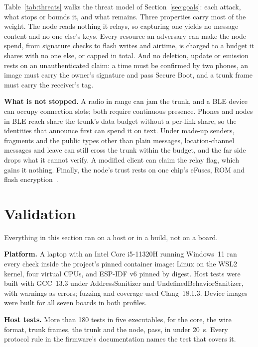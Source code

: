 \documentclass[conference]{IEEEtran}
\begin{document}
Table~\ref{tab:threats} walks the threat model of Section~\ref{sec:goals}: each attack, what stops or bounds it, and what remains. Three properties carry most of the weight. The node reads nothing it relays, so capturing one yields no message content and no one else's keys. Every resource an adversary can make the node spend, from signature checks to flash writes and airtime, is charged to a budget it shares with no one else, or capped in total. And no deletion, update or emission rests on an unauthenticated claim: a time must be confirmed by two phones, an image must carry the owner's signature and pass Secure Boot, and a trunk frame must carry the receiver's tag.

\textbf{What is not stopped.} A radio in range can jam the trunk, and a BLE device can occupy connection slots; both require continuous presence. Phones and nodes in BLE reach share the trunk's data budget without a per-link share, so the identities that announce first can spend it on text. Under made-up senders, fragments and the public types other than plain messages, location-channel messages and leave can still cross the trunk within the budget, and the far side drops what it cannot verify. A modified client can claim the relay flag, which gains it nothing. Finally, the node's trust rests on one chip's eFuses, ROM and flash encryption~\cite{espidf_security}.

\section{Validation}
\label{sec:validation}

Everything in this section ran on a host or in a build, not on a board.

\textbf{Platform.} A laptop with an Intel Core i5-11320H running Windows~11 ran every check inside the project's pinned container image: Linux on the WSL2 kernel, four virtual CPUs, and ESP-IDF v6 pinned by digest. Host tests were built with GCC~13.3 under AddressSanitizer and UndefinedBehaviorSanitizer, with warnings as errors; fuzzing and coverage used Clang~18.1.3. Device images were built for all seven boards in both profiles.

\textbf{Host tests.} More than 180 tests in five executables, for the core, the wire format, trunk frames, the trunk and the node, pass, in under 20~s. Every protocol rule in the firmware's documentation names the test that covers it.
\end{document}
